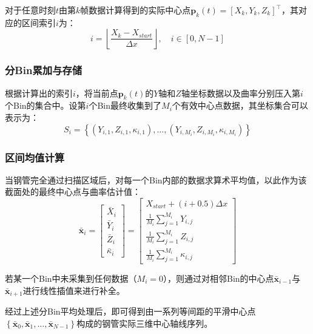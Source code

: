 \documentclass{article}
\begin{document}
对于任意时刻$t$由第$k$帧数据计算得到的实际中心点$\mathbf{p}_k(t) = [X_k, Y_k, Z_k]^\top$，其对应的区间索引$i$为：
\begin{equation}
    i = \left\lfloor \frac{X_k - X_{start}}{\Delta x} \right\rfloor, \quad i \in [0, N-1]
\end{equation}

\subsubsection{分Bin累加与存储}

根据计算出的索引$i$，将当前点$\mathbf{p}_k(t)$的$Y$轴和$Z$轴坐标数据以及曲率分别压入第$i$个Bin的集合中。设第$i$个Bin最终收集到了$M_i$个有效中心点数据，其坐标集合可以表示为：
\begin{equation}
    S_i = \left\{ (Y_{i,1}, Z_{i,1}, \kappa_{i,1}), \dots, (Y_{i,M_i}, Z_{i,M_i}, \kappa_{i,M_i}) \right\}
\end{equation}

\subsubsection{区间均值计算}

当钢管完全通过扫描区域后，对每一个Bin内部的数据求算术平均值，以此作为该截面处的最终中心点与曲率估计值：
\begin{equation}
    \bar{\mathbf{x}}_i =
    \begin{bmatrix}
    \bar{X}_i \\ \bar{Y}_i \\ \bar{Z}_i \\ \bar{\kappa}_i
    \end{bmatrix}
    =
    \begin{bmatrix}
    X_{start} + \left(i + 0.5\right)\Delta x \\
    \frac{1}{M_i} \sum_{j=1}^{M_i} Y_{i,j} \\
    \frac{1}{M_i} \sum_{j=1}^{M_i} Z_{i,j} \\
    \frac{1}{M_i} \sum_{j=1}^{M_i} \kappa_{i,j}
    \end{bmatrix}
\end{equation}

若某一个Bin中未采集到任何数据（$M_i = 0$），则通过对相邻Bin的中心点$\bar{\mathbf{x}}_{i-1}$与$\bar{\mathbf{x}}_{i+1}$进行线性插值来进行补全。

经过上述分Bin平均处理后，即可得到由一系列等间距的平滑中心点$\left\{ \bar{\mathbf{x}}_0, \bar{\mathbf{x}}_1, \dots, \bar{\mathbf{x}}_{N-1} \right\}$构成的钢管实际三维中心轴线序列。
\end{document}
